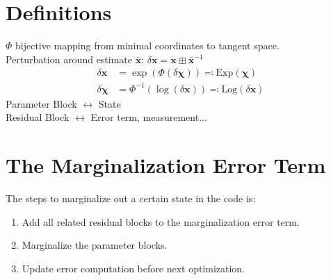 \documentclass[10pt,a4paper]{article}
\author{Andreas Forster}
\numberwithin{equation}{section}
\renewcommand{\vec}[1]{\ensuremath{\mathbf{#1}}}
\newcommand{\vecs}[1]{\ensuremath{\boldsymbol{#1}}}
\newcommand{\Exp}{\mathrm{Exp}}
\newcommand{\Log}{\mathrm{Log}}
\newcommand{\stplus}{\boxplus}
\begin{document}
\section{Definitions}
$\Phi$ bijective mapping from minimal coordinates to tangent space.\\
Perturbation around estimate $\bar{\vec{x}}$: $\delta\vec{x} = \vec{x}\stplus\bar{\vec{x}}^{-1}$
\begin{align*}
\delta\vec{x} &= \exp(\Phi(\delta\vecs{\chi})) \eqqcolon \Exp(\vecs{\chi})\\
\delta\vecs{\chi} &= \Phi^{-1}(\log(\delta\vec{x})) \eqqcolon \Log(\delta\vec{x})
\end{align*}
Parameter Block $\leftrightarrow$ State\\
Residual Block $\leftrightarrow$ Error term, measurement...

\section{The Marginalization Error Term}
The steps to marginalize out a certain state in the code is:
\begin{enumerate}
\item Add all related residual blocks to the marginalization error term.
\item Marginalize the parameter blocks.
\item Update error computation before next optimization.
\end{enumerate}
\end{document}
